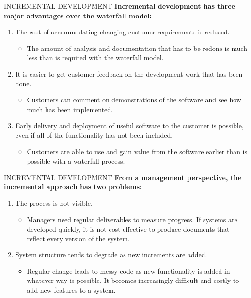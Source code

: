 \documentclass{beamer}
\begin{document}
\begin{frame}{INCREMENTAL DEVELOPMENT}
	\textbf{Incremental development has three major advantages over the waterfall model:}
	\begin{enumerate}
		\item The cost of accommodating changing customer requirements is reduced. 
		\begin{itemize}
			\item The amount of analysis and documentation that has to be redone is much less than is required with the waterfall model.
		\end{itemize}
	\item It is easier to get customer feedback on the development work that has been done.
	\begin{itemize}
		\item Customers can comment on demonstrations of the software and see how much 
		has been implemented.
	\end{itemize}
\item Early delivery and deployment of useful software to the customer is possible, 
even if all of the functionality has not been included.
\begin{itemize}
	\item Customers are able to use 
	and gain value from the software earlier than is possible with a waterfall process.
\end{itemize} 
	\end{enumerate}
\end{frame}
\begin{frame}{INCREMENTAL DEVELOPMENT}
	\textbf{From a management perspective, the incremental approach has two problems:}
	\begin{enumerate}
		\item The process is not visible. 
		\begin{itemize}
			\item Managers need regular deliverables to measure progress.       If systems are developed quickly, it is not cost effective to produce documents that reflect every version of the system.
		\end{itemize}
	\item System structure tends to degrade as new increments are added.
	\begin{itemize}
		\item Regular change leads  to messy code as new functionality is added in whatever way is possible. It becomes increasingly difficult and costly to add new features to a system. 
	\end{itemize}
	\end{enumerate}
\end{frame}
\end{document}
